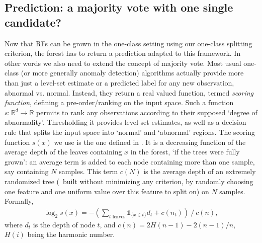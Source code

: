 \subsection{Prediction: a majority vote with one single candidate?}
\label{ocrf:sec:prediction}
 Now that RFs can be grown in the one-class setting using our one-class splitting criterion, the forest has to return a prediction adapted to this framework.
 In other words we also need to extend the concept of majority vote.
%
Most usual one-class (or more generally anomaly detection) algorithms actually provide more than just a level-set estimate or a predicted label for any new observation, abnormal vs. normal. Instead, they return a real valued function, termed \textit{scoring function}, defining a pre-order/ranking on the input space. Such a function $s: \mathbb{R}^d \to \mathbb{R}$ permits to rank any observations according to their supposed `degree of abnormality'. Thresholding it provides level-set estimates, as well as a decision rule that splits the input space into `normal' and `abnormal' regions.
%
%
The scoring function $s(x)$ we use is the one defined in \cite{Liu2008}. It is a decreasing function of the average depth of the leaves containing $x$ in the forest, `if the trees were fully grown': an average term is added to each node containing more than one sample, say containing $N$ samples. This term $c(N)$ is the average depth of an extremely randomized tree \citep{Geurts2006} (\ie~built without minimizing any criterion, by randomly choosing one feature and one uniform value over this feature to split on) on $N$ samples. Formally,
\begin{align}
\label{ocrf:eq:scoring3}
\log_2 s(x) = -\left(\sum_{t \text{~leaves}} \mathds{1}_{\{ x \in t \}} d_t + c(n_t)\right) ~/~ c(n),
\end{align}
where $d_t$ is the depth of node $t$, and $c(n) = 2H(n - 1) - 2(n - 1)/n$, $H(i)$ being the harmonic number.
%
